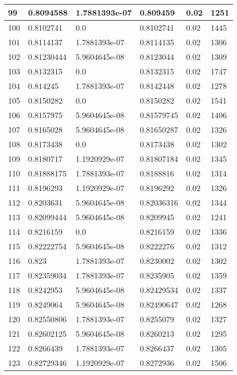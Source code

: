 \begin{longtable}{|l|l|l|l|l|l|}
99 & 0.8094588 & 1.7881393e-07 & 0.809459 & 0.02 & 1251 \\ \hline 
100 & 0.8102741 & 0.0 & 0.8102741 & 0.02 & 1445 \\ \hline 
101 & 0.8114137 & 1.7881393e-07 & 0.8114135 & 0.02 & 1306 \\ \hline 
102 & 0.81230444 & 5.9604645e-08 & 0.8123044 & 0.02 & 1309 \\ \hline 
103 & 0.8132315 & 0.0 & 0.8132315 & 0.02 & 1747 \\ \hline 
104 & 0.814245 & 1.7881393e-07 & 0.8142448 & 0.02 & 1278 \\ \hline 
105 & 0.8150282 & 0.0 & 0.8150282 & 0.02 & 1541 \\ \hline 
106 & 0.8157975 & 5.9604645e-08 & 0.81579745 & 0.02 & 1406 \\ \hline 
107 & 0.8165028 & 5.9604645e-08 & 0.81650287 & 0.02 & 1326 \\ \hline 
108 & 0.8173438 & 0.0 & 0.8173438 & 0.02 & 1302 \\ \hline 
109 & 0.8180717 & 1.1920929e-07 & 0.81807184 & 0.02 & 1345 \\ \hline 
110 & 0.81888175 & 1.7881393e-07 & 0.8188816 & 0.02 & 1314 \\ \hline 
111 & 0.8196293 & 1.1920929e-07 & 0.8196292 & 0.02 & 1326 \\ \hline 
112 & 0.8203631 & 5.9604645e-08 & 0.82036316 & 0.02 & 1344 \\ \hline 
113 & 0.82099444 & 5.9604645e-08 & 0.8209945 & 0.02 & 1241 \\ \hline 
114 & 0.8216159 & 0.0 & 0.8216159 & 0.02 & 1336 \\ \hline 
115 & 0.82222754 & 5.9604645e-08 & 0.8222276 & 0.02 & 1312 \\ \hline 
116 & 0.823 & 1.7881393e-07 & 0.8230002 & 0.02 & 1302 \\ \hline 
117 & 0.82359034 & 1.7881393e-07 & 0.8235905 & 0.02 & 1359 \\ \hline 
118 & 0.8242953 & 5.9604645e-08 & 0.82429534 & 0.02 & 1337 \\ \hline 
119 & 0.8249064 & 5.9604645e-08 & 0.82490647 & 0.02 & 1268 \\ \hline 
120 & 0.82550806 & 1.7881393e-07 & 0.8255079 & 0.02 & 1327 \\ \hline 
121 & 0.82602125 & 5.9604645e-08 & 0.8260213 & 0.02 & 1295 \\ \hline 
122 & 0.8266439 & 1.7881393e-07 & 0.8266437 & 0.02 & 1305 \\ \hline 
123 & 0.82729346 & 1.1920929e-07 & 0.8272936 & 0.02 & 1506 \\ \hline 

\end{longtable}
